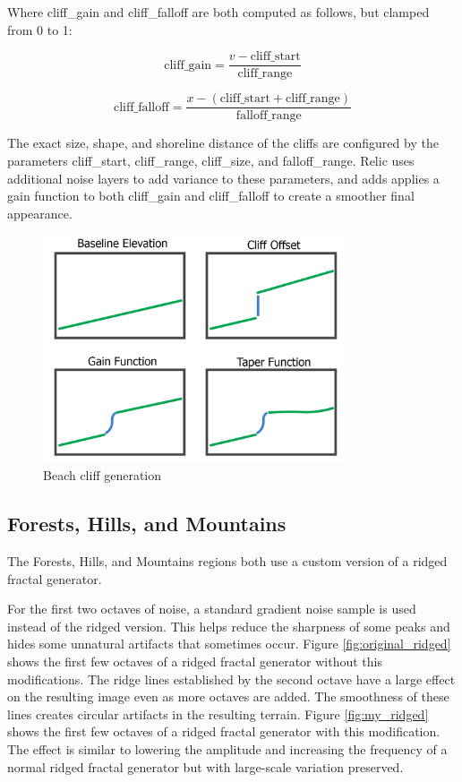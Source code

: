 Where cliff\_gain and cliff\_falloff are both computed as follows, but clamped from 0 to 1:

$$
\text{cliff\_gain} = \frac{v - \text{cliff\_start}}{\text{cliff\_range}}
$$

$$
\text{cliff\_falloff} = \frac{x - (\text{cliff\_start} + \text{cliff\_range})}{\text{falloff\_range}}
$$

The exact size, shape, and shoreline distance of the cliffs are configured by the parameters cliff\_start, cliff\_range, cliff\_size, and falloff\_range.
Relic uses additional noise layers to add variance to these parameters, and adds applies a gain function to both cliff\_gain and cliff\_falloff to create a smoother final appearance.

\begin{figure}
	\centering
		\includegraphics[width=0.8\textwidth]{figures/beachcliffs4x4}
	\caption{Beach cliff generation}
	\label{fig:beach_cliffs}
\end{figure}

\subsection{Forests, Hills, and Mountains}

The Forests, Hills, and Mountains regions both use a custom version of a ridged fractal generator.

For the first two octaves of noise, a standard gradient noise sample is used instead of the ridged version.
This helps reduce the sharpness of some peaks and hides some unnatural artifacts that sometimes occur.
Figure \ref{fig:original_ridged} shows the first few octaves of a ridged fractal generator without this modifications.
The ridge lines established by the second octave have a large effect on the resulting image even as more octaves are added.
The smoothness of these lines creates circular artifacts in the resulting terrain.
Figure \ref{fig:my_ridged} shows the first few octaves of a ridged fractal generator with this modification.
The effect is similar to lowering the amplitude and increasing the frequency of a normal ridged fractal generator but with large-scale variation preserved.

